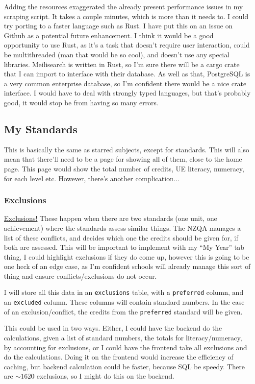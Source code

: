 \documentclass{article}
\begin{document}
Adding the resources exaggerated the already present performance issues in my scraping script. It takes a couple minutes, which is more than it needs to. I could try porting to a faster language such as Rust. I have put this on an issue on Github as a potential future enhancement. I think it would be a good opportunity to use Rust, as it's a task that doesn't require user interaction, could be multithreaded (man that would be so cool), and doesn't use any special libraries. Meilisearch is written in Rust, so I'm sure there will be a cargo crate that I can import to interface with their database. As well as that, PostgreSQL is a very common enterprise database, so I'm confident there would be a nice crate interface. I would have to deal with strongly typed languages, but that's probably good, it would stop be from having so many errors.

\subsection*{My Standards}
This is basically the same as starred subjects, except for standards. This will also mean that there'll need to be a page for showing all of them, close to the home page. This page would show the total number of credits, UE literacy, numeracy, for each level etc. However, there's another complication...

\subsubsection*{Exclusions}
\href{https://www.nzqa.govt.nz/qualifications-standards/standards/standards-exclusion-list/}{Exclusions!} These happen when there are two standards (one unit, one achievement) where the standards assess similar things. The NZQA manages a list of these conflicts, and decides which one the credits should be given for, if both are assessed. This will be important to implement with my ``My Year'' tab thing, I could highlight exclusions if they do come up, however this is going to be one heck of an edge case, as I'm confident schools will already manage this sort of thing and ensure conflicts/exclusions do not occur.

I will store all this data in an \texttt{exclusions} table, with a \texttt{preferred} column, and an \texttt{excluded} column. These columns will contain standard numbers. In the case of an exclusion/conflict, the credits from the \texttt{preferred} standard will be given.

This could be used in two ways. Either, I could have the backend do the calculations, given a list of standard numbers, the totals for literacy/numeracy, by accounting for exclusions, or I could have the frontend take all exclusions and do the calculations. Doing it on the frontend would increase the efficiency of caching, but backend calculation could be faster, because SQL be speedy. There are $\sim1620$ exclusions, so I might do this on the backend.
\end{document}
